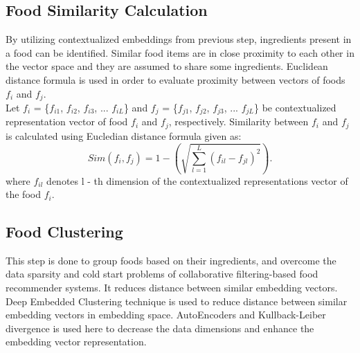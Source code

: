 \subsection{Food Similarity Calculation}
By utilizing contextualized embeddings from previous step, ingredients present in a food can be identified. Similar food items are in close proximity to each other in the vector space and they are assumed to share some ingredients\cite*{9775081, oulu_tdlgc}. Euclidean distance formula is used in order to evaluate proximity between vectors of foods $f_i$ and $f_j$.
\\
\indent Let $f_i$ = \{$f_{i1}$, $f_{i2}$, $f_{i3}$, ... $f_{iL}$\} and $f_j$ = \{$f_{j1}$, $f_{j2}$, $f_{j3}$, ... $f_{jL}$\} be contextualized representation vector of food $f_i$ and $f_j$, respectively\cite*{9775081}. Similarity between $f_i$ and $f_j$ is calculated using Eucledian distance formula given as\cite*{9775081, oulu_tdlgc}:
\begin{equation*} Sim\left({f_{i},f_{j}}\right)=1-\left({\sqrt {\sum _{l=1}^{L}\left({f_{il}-f_{jl}}\right)^{2}}}\right). \tag{5}\end{equation*}
where $f_{il}$ denotes l - th dimension of the contextualized representations vector of the food $f_i$.

\subsection{Food Clustering}
This step is done to group foods based on their ingredients, and overcome the data sparsity and cold start problems of collaborative filtering-based food recommender systems. It reduces distance between similar embedding vectors.
\\
\indent Deep Embedded Clustering technique is used to reduce distance between similar embedding vectors in embedding space\cite*{DBLP:journals/corr/XieGF15}. AutoEncoders and Kullback-Leiber divergence is used here to decrease the data dimensions and enhance the embedding vector representation\cite*{9775081, oulu_tdlgc}.

